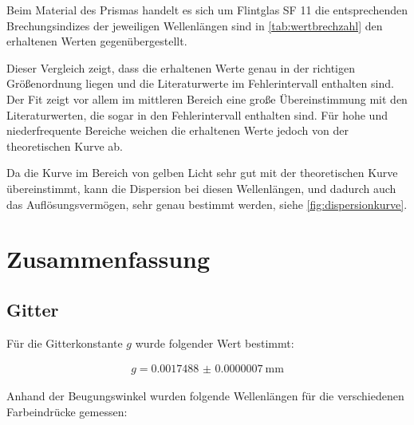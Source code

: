 \documentclass[11pt,ngerman]{scrartcl}
\begin{document}
Beim Material des Prismas handelt es sich um Flintglas SF 11 die entsprechenden
Brechungsindizes der jeweiligen Wellenlängen sind in
\autoref{tab:wertbrechzahl} den erhaltenen Werten gegenübergestellt.
\cite{brechzahl}


Dieser Vergleich zeigt, dass die erhaltenen Werte genau in der richtigen Größenordnung liegen und die Literaturwerte im Fehlerintervall enthalten sind.
Der Fit zeigt vor allem im mittleren Bereich eine große Übereinstimmung mit den Literaturwerten, die sogar in den Fehlerintervall enthalten sind. Für hohe und niederfrequente Bereiche weichen die erhaltenen Werte jedoch von der theoretischen Kurve ab.

\vspace{2mm}

Da die Kurve im Bereich von gelben Licht sehr gut mit der theoretischen Kurve übereinstimmt, kann die Dispersion bei diesen Wellenlängen, und dadurch auch das Auflösungsvermögen, sehr genau bestimmt werden, siehe \autoref{fig:dispersionkurve}.

\newpage

\section{Zusammenfassung}

\subsection{Gitter}

Für die Gitterkonstante $g$ wurde folgender Wert bestimmt:

\begin{align*}
	g = \SI{0.0017488(7)}{\mm}
\end{align*}

Anhand der Beugungswinkel wurden folgende Wellenlängen für die verschiedenen Farbeindrücke gemessen:
\end{document}

